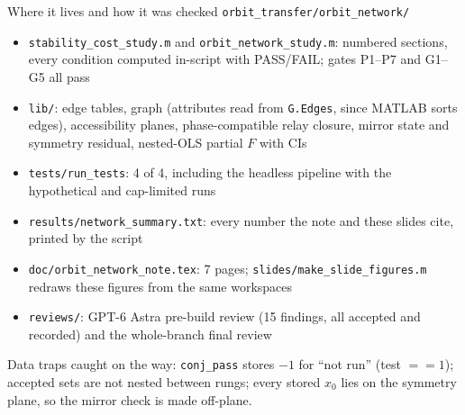 \documentclass[aspectratio=169,10pt]{beamer}
\newcommand{\key}[1]{\texttt{#1}}
\begin{document}
\begin{frame}{Where it lives and how it was checked}
  \small
  \key{orbit\_transfer/orbit\_network/}
  \begin{itemize}
    \setlength\itemsep{4pt}
    \item \key{stability\_cost\_study.m} and \key{orbit\_network\_study.m}: numbered sections, every condition computed in-script with PASS/FAIL; gates P1--P7 and G1--G5 all pass
    \item \key{lib/}: edge tables, graph (attributes read from \key{G.Edges}, since MATLAB sorts edges), accessibility planes, phase-compatible relay closure, mirror state and symmetry residual, nested-OLS partial $F$ with CIs
    \item \key{tests/run\_tests}: 4 of 4, including the headless pipeline with the hypothetical and cap-limited runs
    \item \key{results/network\_summary.txt}: every number the note and these slides cite, printed by the script
    \item \key{doc/orbit\_network\_note.tex}: 7 pages; \key{slides/make\_slide\_figures.m} redraws these figures from the same workspaces
    \item \key{reviews/}: GPT-6 Astra pre-build review (15 findings, all accepted and recorded) and the whole-branch final review
  \end{itemize}
  \vspace{4pt}
  Data traps caught on the way: \key{conj\_pass} stores $-1$ for ``not run'' (test $==1$); accepted sets are not nested between rungs; every stored $x_0$ lies on the symmetry plane, so the mirror check is made off-plane.
\end{frame}
\end{document}
